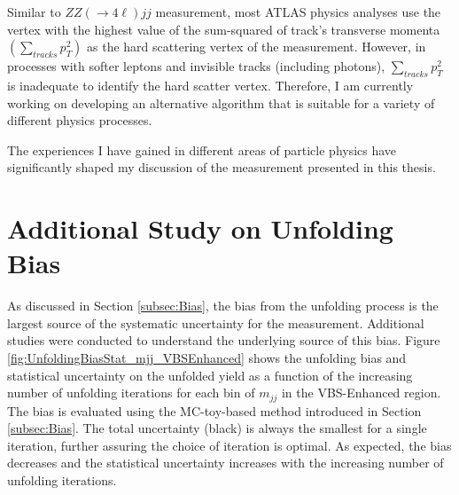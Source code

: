 Similar to $ZZ(\rightarrow 4\ell)jj$ measurement, most ATLAS physics analyses use the vertex with the highest value of the sum-squared of track's transverse momenta $(\sum_{tracks}{p_{T}^2})$ as the hard scattering vertex of the measurement. However, in processes with softer leptons and invisible tracks (including photons), $\sum_{tracks}{p_{T}^2}$ is inadequate to identify the hard scatter vertex. Therefore, I am currently working on developing an alternative algorithm that is suitable for a variety of different physics processes. 

The experiences I have gained in different areas of particle physics have significantly shaped my discussion of the measurement presented in this thesis.  

\section{Additional Study on Unfolding Bias}
\label{Appendix:Unfolding_bias}
As discussed in Section \ref{subsec:Bias}, the bias from the unfolding process is the largest source of the systematic uncertainty for the measurement. Additional studies were conducted to understand the underlying source of this bias. Figure \ref{fig:UnfoldingBiasStat_mjj_VBSEnhanced} shows the unfolding bias and statistical uncertainty on the unfolded yield as a function of the increasing number of unfolding iterations for each bin of $m_{jj}$ in the VBS-Enhanced region. The bias is evaluated using the MC-toy-based method introduced in Section \ref{subsec:Bias}. The total uncertainty (black) is always the smallest for a single iteration, further assuring the choice of iteration is optimal. As expected, the bias decreases and the statistical uncertainty increases with the increasing number of unfolding iterations.

